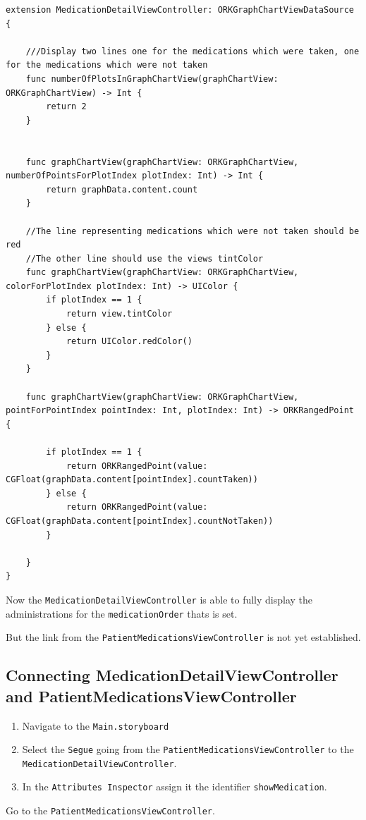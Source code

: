 \documentclass{article}
\begin{document}
\begin{verbatim}
extension MedicationDetailViewController: ORKGraphChartViewDataSource {

    ///Display two lines one for the medications which were taken, one for the medications which were not taken
    func numberOfPlotsInGraphChartView(graphChartView: ORKGraphChartView) -> Int {
        return 2
    }


    func graphChartView(graphChartView: ORKGraphChartView, numberOfPointsForPlotIndex plotIndex: Int) -> Int {
        return graphData.content.count
    }

    //The line representing medications which were not taken should be red
    //The other line should use the views tintColor
    func graphChartView(graphChartView: ORKGraphChartView, colorForPlotIndex plotIndex: Int) -> UIColor {
        if plotIndex == 1 {
            return view.tintColor
        } else {
            return UIColor.redColor()
        }
    }

    func graphChartView(graphChartView: ORKGraphChartView, pointForPointIndex pointIndex: Int, plotIndex: Int) -> ORKRangedPoint {

        if plotIndex == 1 {
            return ORKRangedPoint(value: CGFloat(graphData.content[pointIndex].countTaken))
        } else {
            return ORKRangedPoint(value: CGFloat(graphData.content[pointIndex].countNotTaken))
        }

    }
}
\end{verbatim}

Now the \texttt{MedicationDetailViewController} is able to fully display
the administrations for the \texttt{medicationOrder} thats is set.

But the link from the \texttt{PatientMedicationsViewController} is not
yet established.

\subsection{Connecting MedicationDetailViewController and PatientMedicationsViewController}\label{connecting-medicationdetailviewcontroller-and-patientmedicationsviewcontroller}
\begin{enumerate}
  \item
    Navigate to the \texttt{Main.storyboard}
  \item
    Select the \texttt{Segue} going from the \texttt{PatientMedicationsViewController} to the \texttt{MedicationDetailViewController}.
  \item
    In the \texttt{Attributes\ Inspector} assign it the identifier \texttt{showMedication}.
\end{enumerate}
Go to the \texttt{PatientMedicationsViewController}.
\end{document}
